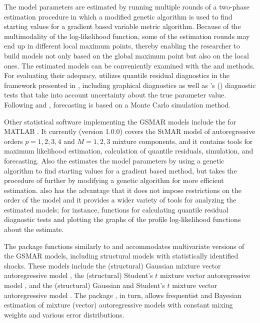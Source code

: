 \documentclass[nojss]{jss} %
\begin{document}
The model parameters are estimated by running multiple rounds of a two-phase estimation procedure in which a modified genetic algorithm is used to find starting values for a gradient based variable metric algorithm. Because of the multimodality of the log-likelihood function, some of the estimation rounds may end up in different local maximum points, thereby enabling the researcher to build models not only based on the global maximum point but also on the local ones. The estimated models can be conveniently examined with the  and  methods. For evaluating their adequacy,  utilizes quantile residual diagnostics in the framework presented in \cite{Kalliovirta:2012}, including graphical diagnostics as well as \citeauthor{Kalliovirta:2012}'s (\citeyear{Kalliovirta:2012}) diagnostic tests that take into account uncertainty about the true parameter value. Following \cite{Kalliovirta+Meitz+Saikkonen:2015} and \cite{Meitz+Preve+Saikkonen:2021}, forecasting is based on a Monte Carlo simulation method.

Other statistical software implementing the GSMAR models include the  for MATLAB \citep{Meitz+Preve+Saikkonen2:2018}. It currently (version 1.0.0) covers the StMAR model of autoregressive orders $p=1,2,3,4$ and $M=1,2,3$ mixture components, and it contains tools for maximum likelihood estimation, calculation of quantile residuals, simulation, and forecasting. Also the  estimates the model parameters by using a genetic algorithm to find starting values for a gradient based method, but  takes the procedure of \cite{Meitz+Preve+Saikkonen2:2018, Meitz+Preve+Saikkonen:2021} further by modifying a genetic algorithm for more efficient estimation.  also has the advantage that it does not impose restrictions on the order of the model and it provides a wider variety of tools for analyzing the estimated models; for instance, functions for calculating quantile residual diagnostic tests \citep{Kalliovirta:2012} and plotting the graphs of the profile log-likelihood functions about the estimate.

The  package  \citep{Virolainen:2018} functions similarly to  and accommodates multivariate versions of the GSMAR models, including structural models with statistically identified shocks. These models include the (structural) Gaussian mixture vector autoregressive model \citep{Kalliovirta+Meitz+Saikkonen:2016, Virolainen:2025}, the (structural) Student's $t$ mixture vector autoregressive model \citep{Virolainen2:2021}, and the (structural) Gaussian and Student's $t$ mixture vector autoregressive model \citep{Virolainen2:2021}. The  package  \citep{Boshnakov+Ravagli:2021}, in turn, allows frequentist and Bayesian estimation of mixture (vector) autoregressive models with constant mixing weights \citep[e.g.,][]{Wong+Li:2000, Fong+Li+Yau+Wong:2007} and various error distributions.
\end{document}
